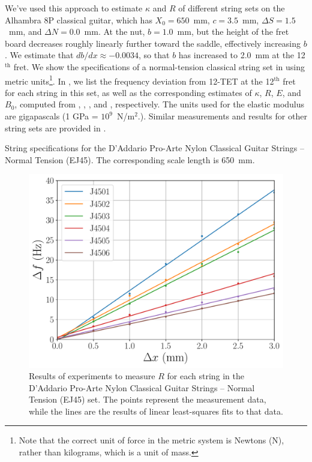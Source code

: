 We've used this approach to estimate $\kappa$ and $R$ of different string sets on the Alhambra 8P classical guitar, which has $X_0 = 650$~mm, $c = 3.5$~mm, $\Delta S = 1.5$~mm, and $\Delta N = 0.0$~mm. At the nut, $b = 1.0$~mm, but the height of the fret board decreases roughly linearly further toward the saddle, effectively increasing $b$. We estimate that $d b / d x \approx -0.0034$, so that $b$ has increased to 2.0~mm at the 12$^{\text{th}}$ fret. We show the specifications of a normal-tension classical string set in  using metric units\footnote{Note that the correct unit of force in the metric system is Newtons (N), rather than kilograms, which is a unit of mass.}. In , we list the frequency deviation from 12-TET at the 12$^{\text{th}}$ fret for each string in this set, as well as the corresponding estimates of $\kappa$, $R$, $E$, and $B_0$, computed from , , , and , respectively. The units used for the elastic modulus are gigapascals (1 GPa = $10^9$~N/m$^2$.). Similar measurements and results for other string sets are provided in .

\begin{table}%
  \centering
  \caption{\label{tbl:ej45_mks} String specifications for the D'Addario Pro-Arte Nylon Classical Guitar Strings -- Normal Tension (EJ45). The corresponding scale length is 650~mm.}
  
\end{table}%

\begin{figure}
  \centering
  \includegraphics[width=5.0in]{../figures/fit_ej45}
  \caption{\label{fig:fit_ej45} Results of experiments to measure $R$ for each string in the D'Addario Pro-Arte Nylon Classical Guitar Strings -- Normal Tension (EJ45) set. The points represent the measurement data, while the lines are the results of linear least-squares fits to that data.}
 \end{figure}


